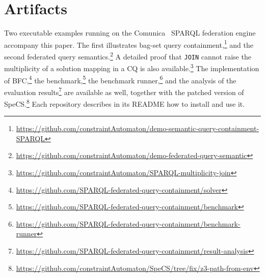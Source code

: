 \section*{Artifacts}
Two executable examples running on the Comunica~\cite{taelman_iswc_resources_comunica_2018} SPARQL federation engine accompany this paper.
The first illustrates bag-set query containment,\footnote{\url{https://github.com/constraintAutomaton/demo-semantic-query-containment-SPARQL}} and the second federated query semantics.\footnote{\url{https://github.com/constraintAutomaton/demo-federated-query-semantic}}
A detailed proof that \texttt{JOIN} cannot raise the multiplicity of a solution mapping in a \ac{CQ} is also available.\footnote{\url{https://github.com/constraintAutomaton/SPARQL-multiplicity-join}}
The implementation of \ac{BFC},\footnote{\url{https://github.com/SPARQL-federated-query-containment/solver}} the benchmark,\footnote{\url{https://github.com/SPARQL-federated-query-containment/benchmark}} the benchmark runner,\footnote{\url{https://github.com/SPARQL-federated-query-containment/benchmark-runner}} and the analysis of the evaluation results\footnote{\url{https://github.com/SPARQL-federated-query-containment/result-analysis}} are available as well, together with the patched version of SpeCS.\footnote{\url{https://github.com/constraintAutomaton/SpeCS/tree/fix/z3-path-from-env}}
Each repository describes in its README how to install and use it.
